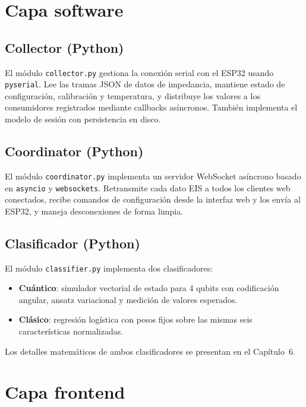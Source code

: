 \documentclass[11pt,a4paper,spanish]{book}
\begin{document}
\section{Capa software}

\subsection{Collector (Python)}

El m\'{o}dulo \texttt{collector.py} gestiona la conexi\'{o}n serial con el ESP32 usando \texttt{pyserial}. Lee las tramas JSON de datos de impedancia, mantiene estado de configuraci\'{o}n, calibraci\'{o}n y temperatura, y distribuye los valores a los consumidores registrados mediante callbacks as\'{i}ncronos. Tambi\'{e}n implementa el modelo de sesi\'{o}n con persistencia en disco.

\subsection{Coordinator (Python)}

El m\'{o}dulo \texttt{coordinator.py} implementa un servidor WebSocket as\'{i}ncrono basado en \texttt{asyncio} y \texttt{websockets}. Retransmite cada dato EIS a todos los clientes web conectados, recibe comandos de configuraci\'{o}n desde la interfaz web y los env\'{i}a al ESP32, y maneja desconexiones de forma limpia.

\subsection{Clasificador (Python)}

El m\'{o}dulo \texttt{classifier.py} implementa dos clasificadores:
\begin{itemize}
	\item \textbf{Cu\'{a}ntico}: simulador vectorial de estado para 4 qubits con codificaci\'{o}n angular, ansatz variacional y medici\'{o}n de valores esperados.
	\item \textbf{Cl\'{a}sico}: regresi\'{o}n log\'{i}stica con pesos fijos sobre las mismas seis caracter\'{i}sticas normalizadas.
\end{itemize}
Los detalles matem\'{a}ticos de ambos clasificadores se presentan en el Cap\'{i}tulo~6.

\section{Capa frontend}
\end{document}
